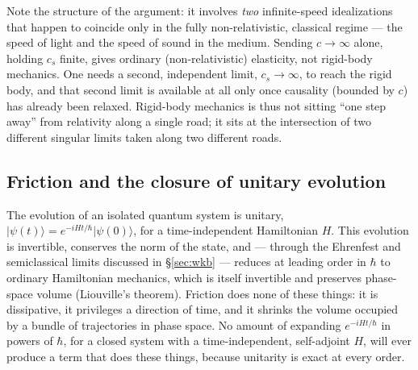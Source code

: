 \documentclass[11pt]{book}
\begin{document}
Note the structure of the argument: it involves \emph{two} infinite-speed idealizations that happen to coincide only in the fully non-relativistic, classical regime --- the speed of light and the speed of sound in the medium. Sending $c\to\infty$ alone, holding $c_s$ finite, gives ordinary (non-relativistic) elasticity, not rigid-body mechanics. One needs a second, independent limit, $c_s\to\infty$, to reach the rigid body, and that second limit is available at all only once causality (bounded by $c$) has already been relaxed. Rigid-body mechanics is thus not sitting ``one step away'' from relativity along a single road; it sits at the intersection of two different singular limits taken along two different roads.

\subsection{Friction and the closure of unitary evolution}
\label{sec:friction}

The evolution of an isolated quantum system is unitary, $\lvert\psi(t)\rangle = e^{-iHt/\hbar}\lvert\psi(0)\rangle$, for a time-independent Hamiltonian $H$. This evolution is invertible, conserves the norm of the state, and --- through the Ehrenfest and semiclassical limits discussed in \S\ref{sec:wkb} --- reduces at leading order in $\hbar$ to ordinary Hamiltonian mechanics, which is itself invertible and preserves phase-space volume (Liouville's theorem). Friction does none of these things: it is dissipative, it privileges a direction of time, and it shrinks the volume occupied by a bundle of trajectories in phase space. No amount of expanding $e^{-iHt/\hbar}$ in powers of $\hbar$, for a closed system with a time-independent, self-adjoint $H$, will ever produce a term that does these things, because unitarity is exact at every order.
\end{document}
